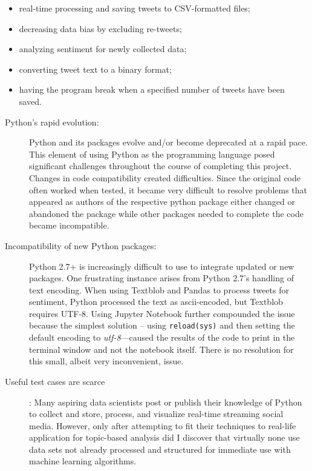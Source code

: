 \begin{itemize}	
\item real-time processing and saving tweets to CSV-formatted files;
\item decreasing data bias by excluding re-tweets;
\item analyzing sentiment for newly collected
data;
\item converting tweet text to a binary format;
\item having the program break when a specified
number of tweets have been saved.
\end{itemize}

\begin{description}
\item[Python's rapid evolution:] Python and its packages evolve and/or
  become deprecated at a rapid pace.  This element of using Python as
  the programming language posed significant challenges throughout the
  course of completing this project.  Changes in code compatibility
  created difficulties.  Since the original code often worked when
  tested, it became very difficult to resolve problems that appeared
  as authors of the respective python package either changed or
  abandoned the package while other packages needed to complete the
  code became incompatible.

\item[Incompatibility of new Python packages:] Python 2.7+ is
  increasingly difficult to use to integrate updated or new packages.
  One frustrating instance arises from Python 2.7's handling of text
  encoding.  When using Textblob and Pandas to process tweets for
  sentiment, Python processed the text as ascii-encoded, but Textblob
  requires UTF-8.  Using Jupyter Notebook further compounded the issue
  because the simplest solution – using \verb|reload(sys)| and then
  setting the default encoding to \emph{utf-8}—caused the results of
  the code to print in the terminal window and not the notebook
  itself.  There is no resolution for this small, albeit very
  inconvenient, issue.

\item[Useful test cases are scarce]: Many aspiring data scientists
  post or publish their knowledge of Python to collect and store,
  process, and visualize real-time streaming social media.  However,
  only after attempting to fit their techniques to real-life
  application for topic-based analysis did I discover that virtually
  none use data sets not already processed and structured for
  immediate use with machine learning algorithms.
\end{description}

